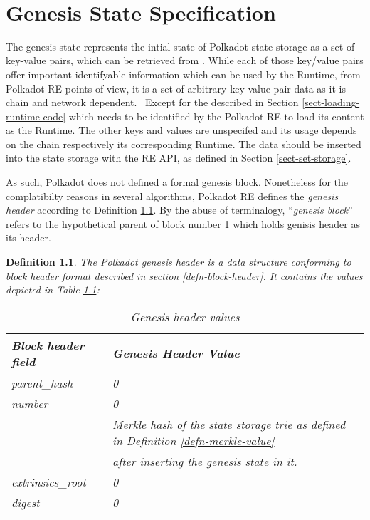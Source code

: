 \documentclass{book}
\newcommand{\tmem}[1]{{\em #1\/}}
\newcommand{\tmsamp}[1]{\textsf{#1}}
\newcommand{\tmtextit}[1]{{\itshape{#1}}}
\newcommand{\tmtextsf}[1]{{\sffamily{#1}}}
\newcommand{\tmtexttt}[1]{{\ttfamily{#1}}}
\newcommand{\tmverbatim}[1]{{\ttfamily{#1}}}
\newtheorem{definition}{Definition}
\providecommand{\tmem}[1]{\tmtextit{#1}}
\providecommand{\tmsamp}[1]{\tmtextsf{#1}}
\providecommand{\tmtextit}[1]{\tmtextit{#1}}
\providecommand{\tmverbatim}[1]{\tmtexttt{#1}}
\newtheorem{definition}{Definition}
\begin{document}
\

\chapter{Genesis State Specification}\label{sect-genesis-block}

The genesis state represents the intial state of Polkadot state storage as a
set of key-value pairs, which can be retrieved from
{\cite{web3.0_technologies_foundation_polkadot_2020}}. While each of those
key/value pairs offer important identifyable information which can be used by
the Runtime, from Polkadot RE points of view, it is a set of arbitrary
key-value pair data as it is chain and network dependent. \ Except for the
\tmverbatim{:code} described in Section \ref{sect-loading-runtime-code} which
needs to be identified by the Polkadot RE to load its content as the Runtime.
The other keys and values are unspecifed and its usage depends on the chain
respectively its corresponding Runtime. The data should be inserted into the
state storage with the \tmverbatim{set\_storage} RE API, as defined in Section
\ref{sect-set-storage}.

As such, Polkadot does not defined a formal genesis block. Nonetheless for the
complatibilty reasons in several algorithms, Polkadot RE defines the
{\tmem{genesis header}} according to Definition \ref{defn-genesis-header}. By
the abuse of terminalogy, ``{\tmem{genesis block}}'' refers to the
hypothetical parent of block number 1 which holds genisis header as its
header.

\begin{definition}
  \label{defn-genesis-header}The Polkadot genesis header is a data structure
  conforming to block header format described in section
  \ref{defn-block-header}. It contains the values depicted in Table
  \ref{tabl-genesis-header}:
  
  \begin{table}[h]
    \begin{tabular}{ll}
      \hline
      Block header field & Genesis Header Value\\
      \hline
      \tmverbatim{}{\tmsamp{parent\_hash}} & 0\\
      {\tmsamp{number}} & 0\\
      \tmverbatim{state\_root} & Merkle hash of the state storage trie as
      defined in Definition \ref{defn-merkle-value} \\
      & after inserting the genesis state in it.\\
      {\tmsamp{extrinsics\_root}} & 0\\
      {\tmsamp{digest}} & 0\\
      \hline
    \end{tabular}
    \caption{\label{tabl-genesis-header}Genesis header values}
  \end{table}
\end{definition}
\end{document}
